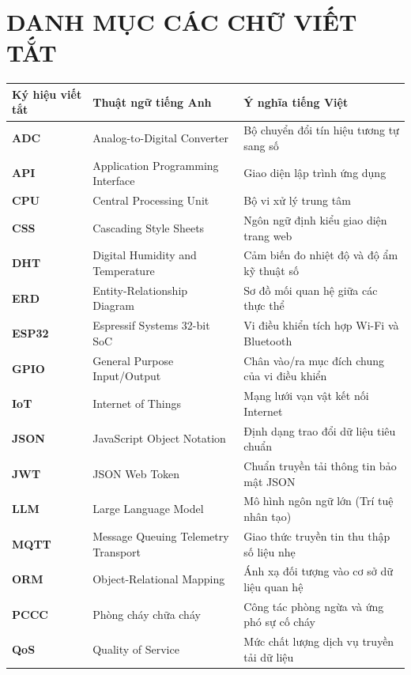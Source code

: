 \chapter*{DANH MỤC CÁC CHỮ VIẾT TẮT}

\begin{table}[H]
\centering
\small
\begin{tabular}{|p{2.8cm}|p{5.5cm}|p{6.0cm}|}
\hline
\textbf{Ký hiệu viết tắt} & \textbf{Thuật ngữ tiếng Anh} & \textbf{Ý nghĩa tiếng Việt} \\
\hline
\textbf{ADC} & Analog-to-Digital Converter & Bộ chuyển đổi tín hiệu tương tự sang số \\
\hline
\textbf{API} & Application Programming Interface & Giao diện lập trình ứng dụng \\
\hline
\textbf{CPU} & Central Processing Unit & Bộ vi xử lý trung tâm \\
\hline
\textbf{CSS} & Cascading Style Sheets & Ngôn ngữ định kiểu giao diện trang web \\
\hline
\textbf{DHT} & Digital Humidity and Temperature & Cảm biến đo nhiệt độ và độ ẩm kỹ thuật số \\
\hline
\textbf{ERD} & Entity-Relationship Diagram & Sơ đồ mối quan hệ giữa các thực thể \\
\hline
\textbf{ESP32} & Espressif Systems 32-bit SoC & Vi điều khiển tích hợp Wi-Fi và Bluetooth \\
\hline
\textbf{GPIO} & General Purpose Input/Output & Chân vào/ra mục đích chung của vi điều khiển \\
\hline
\textbf{IoT} & Internet of Things & Mạng lưới vạn vật kết nối Internet \\
\hline
\textbf{JSON} & JavaScript Object Notation & Định dạng trao đổi dữ liệu tiêu chuẩn \\
\hline
\textbf{JWT} & JSON Web Token & Chuẩn truyền tải thông tin bảo mật JSON \\
\hline
\textbf{LLM} & Large Language Model & Mô hình ngôn ngữ lớn (Trí tuệ nhân tạo) \\
\hline
\textbf{MQTT} & Message Queuing Telemetry Transport & Giao thức truyền tin thu thập số liệu nhẹ \\
\hline
\textbf{ORM} & Object-Relational Mapping & Ánh xạ đối tượng vào cơ sở dữ liệu quan hệ \\
\hline
\textbf{PCCC} & Phòng cháy chữa cháy & Công tác phòng ngừa và ứng phó sự cố cháy \\
\hline
\textbf{QoS} & Quality of Service & Mức chất lượng dịch vụ truyền tải dữ liệu \\

\end{tabular}
\end{table}
